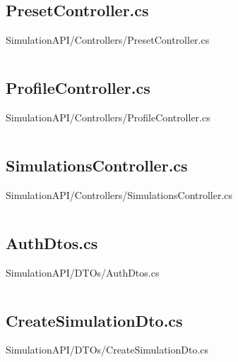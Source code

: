 \inputminted[linenos,breaklines,tabsize=2]{csharp}{/Users/Henry/Desktop/NEAComputerScience/SimulationAPI/Controllers/AuthController.cs}

\makeatletter
\subsection*{PresetController.cs}
SimulationAPI/Controllers/PresetController.cs
\def\@currentlabelname{PresetController.cs}
\label{code:SimulationAPI:Controllers:PresetController.cs}
\makeatother

\inputminted[linenos,breaklines,tabsize=2]{csharp}{/Users/Henry/Desktop/NEAComputerScience/SimulationAPI/Controllers/PresetController.cs}

\makeatletter
\subsection*{ProfileController.cs}
SimulationAPI/Controllers/ProfileController.cs
\def\@currentlabelname{ProfileController.cs}
\label{code:SimulationAPI:Controllers:ProfileController.cs}
\makeatother

\inputminted[linenos,breaklines,tabsize=2]{csharp}{/Users/Henry/Desktop/NEAComputerScience/SimulationAPI/Controllers/ProfileController.cs}

\makeatletter
\subsection*{SimulationsController.cs}
SimulationAPI/Controllers/SimulationsController.cs
\def\@currentlabelname{SimulationsController.cs}
\label{code:SimulationAPI:Controllers:SimulationsController.cs}
\makeatother

\inputminted[linenos,breaklines,tabsize=2]{csharp}{/Users/Henry/Desktop/NEAComputerScience/SimulationAPI/Controllers/SimulationsController.cs}

\makeatletter
\subsection*{AuthDtos.cs}
SimulationAPI/DTOs/AuthDtos.cs
\def\@currentlabelname{AuthDtos.cs}
\label{code:SimulationAPI:DTOs:AuthDtos.cs}
\makeatother

\inputminted[linenos,breaklines,tabsize=2]{csharp}{/Users/Henry/Desktop/NEAComputerScience/SimulationAPI/DTOs/AuthDtos.cs}

\makeatletter
\subsection*{CreateSimulationDto.cs}
SimulationAPI/DTOs/CreateSimulationDto.cs
\def\@currentlabelname{CreateSimulationDto.cs}
\label{code:SimulationAPI:DTOs:CreateSimulationDto.cs}
\makeatother

